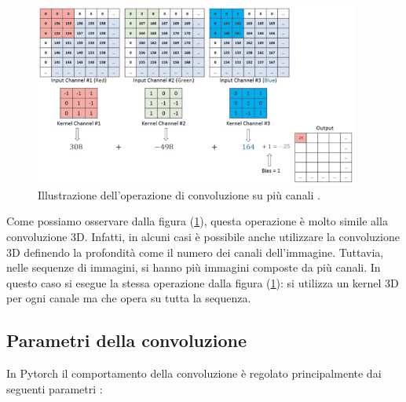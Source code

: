 
\begin{figure}[H]
    \centering
    \includegraphics[width=0.95\textwidth]{Immagini/Generiche/convoluzione_canali.png}
    \caption{Illustrazione dell'operazione di convoluzione su più canali 
    \cite{ELEMENTI_CNN_1}.}
    \label{fig:convoluzioneRGB}
\end{figure}

Come possiamo osservare dalla figura (\ref{fig:convoluzioneRGB}), questa operazione 
è molto simile alla convoluzione 3D. Infatti, in alcuni casi è possibile anche 
utilizzare la convoluzione 3D definendo la profondità come il numero 
dei canali dell'immagine.
Tuttavia, nelle sequenze di immagini, si hanno più immagini composte da più canali.
In questo caso si esegue la stessa operazione dalla figura (\ref{fig:convoluzioneRGB}):
si utilizza un kernel 3D per ogni canale ma che opera su tutta la sequenza.

\subsection{Parametri della convoluzione}
In Pytorch il comportamento della convoluzione è regolato principalmente dai seguenti 
parametri \cite{CONV_PYTORCH}:

